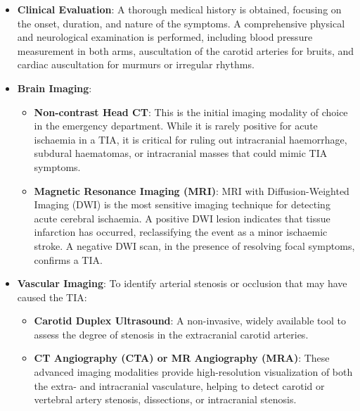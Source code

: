 \begin{itemize}
    \item \textbf{Clinical Evaluation}: A thorough medical history is obtained, focusing on the onset, duration, and nature of the symptoms. A comprehensive physical and neurological examination is performed, including blood pressure measurement in both arms, auscultation of the carotid arteries for bruits, and cardiac auscultation for murmurs or irregular rhythms.

    \item \textbf{Brain Imaging}:
    \begin{itemize}
        \item \textbf{Non-contrast Head CT}: This is the initial imaging modality of choice in the emergency department. While it is rarely positive for acute ischaemia in a TIA, it is critical for ruling out intracranial haemorrhage, subdural haematomas, or intracranial masses that could mimic TIA symptoms.
        \item \textbf{Magnetic Resonance Imaging (MRI)}: MRI with Diffusion-Weighted Imaging (DWI) is the most sensitive imaging technique for detecting acute cerebral ischaemia. A positive DWI lesion indicates that tissue infarction has occurred, reclassifying the event as a minor ischaemic stroke. A negative DWI scan, in the presence of resolving focal symptoms, confirms a TIA.
    \end{itemize}

    \item \textbf{Vascular Imaging}: To identify arterial stenosis or occlusion that may have caused the TIA:
    \begin{itemize}
        \item \textbf{Carotid Duplex Ultrasound}: A non-invasive, widely available tool to assess the degree of stenosis in the extracranial carotid arteries.
        \item \textbf{CT Angiography (CTA) or MR Angiography (MRA)}: These advanced imaging modalities provide high-resolution visualization of both the extra- and intracranial vasculature, helping to detect carotid or vertebral artery stenosis, dissections, or intracranial stenosis.
    \end{itemize}


\end{itemize}
